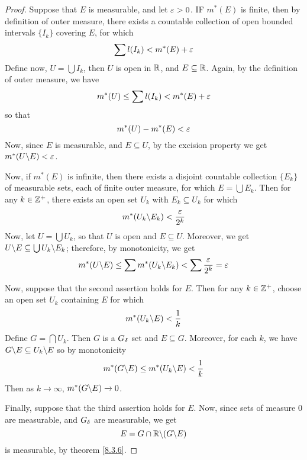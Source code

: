 \begin{proof}
    Suppose that $E$ is measurable, and let  $\varepsilon>0$. IF  $m^\ast(E)$ is finite,
    then by definition of outer measure, there exists a countable collection of
    open bounded intervals $\{I_k\}$ covering $E$, for which
    \begin{equation*}
        \sum{l(I_k)}<m^\ast(E)+\varepsilon
    \end{equation*}
    Define now, $U=\bigcup{I_k}$, then $U$ is open in  $\mathbb{R}$, and  $E \subseteq
    \mathbb{R}$. Again, by the definition of outer measure, we have
    \begin{equation*}
        m^\ast(U) \leq \sum{l(I_k)}<m^\ast(E)+\varepsilon
    \end{equation*}
    so that
    \begin{equation*}
        m^\ast(U)-m^\ast(E)<\varepsilon
    \end{equation*}
    Now, since $E$ is measurable, and  $E \subseteq U$, by the excision property
    we get $m^\ast(U \backslash E)<\varepsilon$.

    Now, if $m^\ast(E)$ is infinite, then there exists a disjoint countable
    collection $\{E_k\}$ of measurable sets, each of finite outer measure, for
    which $E=\bigcup{E_k}$. Then for any $k \in \mathbb{Z}^+$, there exists an open set
     $U_k$ with  $E_k \subseteq U_k$ for which
     \begin{equation*}
         m^\ast(U_k \backslash E_k)<\frac{\varepsilon}{2^k}
     \end{equation*}
     Now, let $U=\bigcup{U_k}$, so that $U$ is open and  $E \subseteq U$.
     Moreover, we get $U \backslash E \subseteq \bigcup{U_k \backslash E_k}$; therefore,
     by monotonicity, we get
     \begin{equation*}
         m^\ast(U \backslash E) \leq
         \sum{m^\ast(U_k \backslash E_k)}<\sum{\frac{\varepsilon}{2^k}}=\varepsilon
     \end{equation*}

     Now, suppose that the second assertion holds for $E$. Then for any  $k \in
     \mathbb{Z}^+$, choose an open set  $U_k$ containing  $E$ for which
     \begin{equation*}
         m^\ast(U_k \backslash E)<\frac{1}{k}
     \end{equation*}
     Define $G=\bigcap{U_k}$. Then $G$ is a $G_\delta$ set and $E \subseteq G$.
     Moreover, for each $k$, we have $G \backslash E \subseteq U_k \backslash E$ so by
     monotonicity
     \begin{equation*}
         m^\ast(G \backslash E) \leq m^\ast(U_k \backslash E)<\frac{1}{k}
     \end{equation*}
     Then as $k \xrightarrow{} \infty$, $m^\ast(G \backslash E) \xrightarrow{} 0$.

     Finally, suppose that the third assertion holds for $E$. Now, since sets of
     measure  $0$ are measurable, and  $G_\delta$ are measurable, we get
     \begin{equation*}
         E=G \cap \mathbb{R} \backslash (G \backslash E)
     \end{equation*}
     is measurable, by theorem \ref{8.3.6}.
\end{proof}

